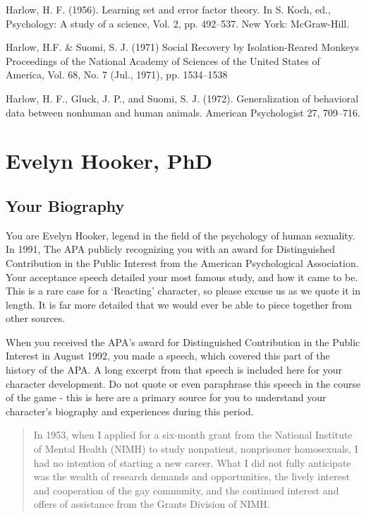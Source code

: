 \begin{refsection}
Harlow, H. F. (1956). Learning set and error factor theory. In S. Koch, ed., Psychology: A study of a science, Vol. 2, pp. 492--537. New York: McGraw-Hill.

Harlow, H.F. \& Suomi, S. J. (1971) Social Recovery by Isolation-Reared Monkeys Proceedings of the National Academy of Sciences of the United States of America, Vol. 68, No. 7 (Jul., 1971), pp. 1534--1538

Harlow, H. F., Gluck, J. P., and Suomi, S. J. (1972). Generalization of behavioral data between nonhuman and human animals. American Psychologist 27, 709--716.

\chapter{Evelyn Hooker, PhD}
\label{evelynhookerphd}

\section{Your Biography}
\label{yourbiography}

You are Evelyn Hooker, legend in the field of the psychology of human sexuality. In 1991, The APA publicly recognizing you with an award for Distinguished Contribution in the Public Interest from the American Psychological Association. Your acceptance speech detailed your most famous study, and how it came to be. This is a rare case for a `Reacting' character, so please excuse us as we quote it in length. It is far more detailed that we would ever be able to piece together from other sources.

When you received the APA's award for Distinguished Contribution in the Public Interest in August 1992, you made a speech, which covered this part of the history of the APA. A long excerpt from that speech is included here for your character development. Do not quote or even paraphrase this speech in the course of the game - this is here are a primary source for you to understand your character's biography and experiences during this period.

\begin{quote}

In 1953, when I applied for a six-month grant from the National Institute of Mental Health (NIMH) to study nonpatient, nonprisoner homosexuals, I had no intention of starting a new career. What I did not fully anticipate was the wealth of research demands and opportunities, the lively interest and cooperation of the gay community, and the continued interest and offers of assistance from the Grants Division of NIMH.


\end{quote}
\end{refsection}

